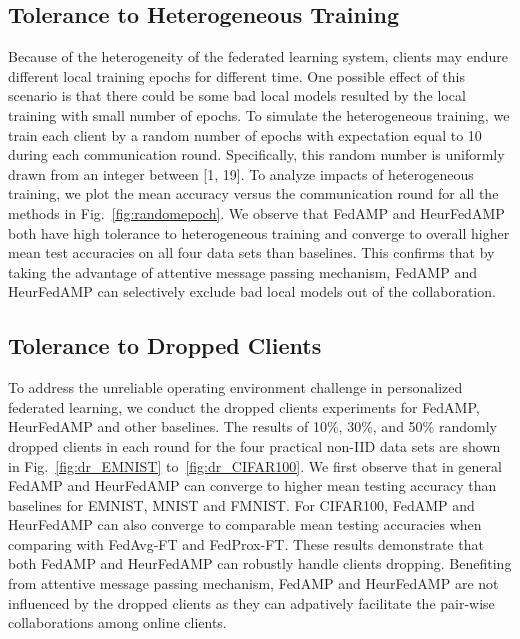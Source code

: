 \subsection{Tolerance to Heterogeneous Training}
Because of the heterogeneity of the federated learning system, clients may endure different local training epochs for different time. One possible effect of this scenario is that there could be some bad local models resulted by the local training with small number of epochs.
To simulate the heterogeneous training, we train each client by a random number of epochs with expectation equal to 10 during each communication round. Specifically, this random number is uniformly drawn from an integer between [1, 19]. To analyze impacts of heterogeneous training, we plot the mean accuracy versus the communication round for all the methods in Fig.~\ref{fig:randomepoch}. We observe that FedAMP and HeurFedAMP both have high tolerance to heterogeneous training and converge to overall higher mean test accuracies on all four data sets than baselines. This confirms that by taking the advantage of attentive message passing mechanism, FedAMP and HeurFedAMP can selectively exclude bad local models out of the collaboration. 



\subsection{Tolerance to Dropped Clients}\label{subsec:supexp-drop}
To address the unreliable operating environment challenge in personalized federated learning, we conduct the dropped clients experiments for FedAMP, HeurFedAMP and other baselines. 
The results of 10\%, 30\%, and 50\% randomly dropped clients in each round for the four practical non-IID data sets are shown in Fig.~\ref{fig:dr_EMNIST} to~\ref{fig:dr_CIFAR100}. We first observe that in general FedAMP and HeurFedAMP can converge to higher mean testing accuracy than baselines
for EMNIST, MNIST and FMNIST. 
For CIFAR100, {FedAMP} and {HeurFedAMP} can also converge to comparable mean testing accuracies when comparing with FedAvg-FT and FedProx-FT.
These results demonstrate that both FedAMP and HeurFedAMP can robustly handle clients dropping.
Benefiting from attentive message passing mechanism, FedAMP and HeurFedAMP are not influenced by the dropped clients as they can adpatively facilitate the pair-wise collaborations among online clients.


